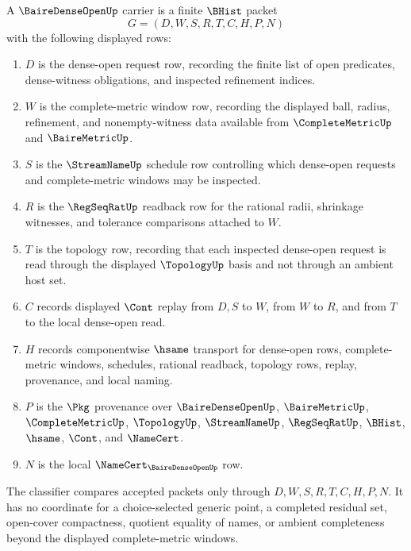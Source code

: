 \begin{definition}
\label{def:baire-dense-open-schedule-carrier}
A $\BaireDenseOpenUp$ carrier is a finite $\BHist$ packet
$$
G=(D,W,S,R,T,C,H,P,N)
$$
with the following displayed rows:
\begin{enumerate}
\item $D$ is the dense-open request row, recording the finite list of open predicates, dense-witness obligations, and inspected refinement indices.
\item $W$ is the complete-metric window row, recording the displayed ball, radius, refinement, and nonempty-witness data available from $\CompleteMetricUp$ and $\BaireMetricUp$.
\item $S$ is the $\StreamNameUp$ schedule row controlling which dense-open requests and complete-metric windows may be inspected.
\item $R$ is the $\RegSeqRatUp$ readback row for the rational radii, shrinkage witnesses, and tolerance comparisons attached to $W$.
\item $T$ is the topology row, recording that each inspected dense-open request is read through the displayed $\TopologyUp$ basis and not through an ambient host set.
\item $C$ records displayed $\Cont$ replay from $D,S$ to $W$, from $W$ to $R$, and from $T$ to the local dense-open read.
\item $H$ records componentwise $\hsame$ transport for dense-open rows, complete-metric windows, schedules, rational readback, topology rows, replay, provenance, and local naming.
\item $P$ is the $\Pkg$ provenance over $\BaireDenseOpenUp$, $\BaireMetricUp$, $\CompleteMetricUp$, $\TopologyUp$, $\StreamNameUp$, $\RegSeqRatUp$, $\BHist$, $\hsame$, $\Cont$, and $\NameCert$.
\item $N$ is the local $\NameCert_{\BaireDenseOpenUp}$ row.
\end{enumerate}
The classifier compares accepted packets only through $D,W,S,R,T,C,H,P,N$. It has no coordinate for a choice-selected generic point, a completed residual set, open-cover compactness, quotient equality of names, or ambient completeness beyond the displayed complete-metric windows.
\end{definition}


